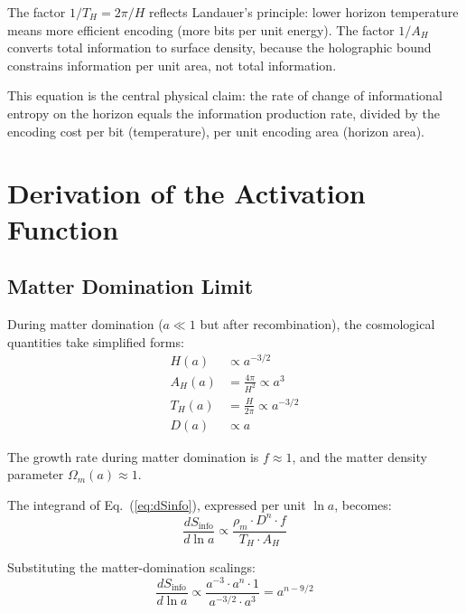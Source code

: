 \documentclass[twocolumn,superscriptaddress,prl,amsmath,amssymb]{revtex4-2}
\begin{document}
The factor $1/T_H = 2\pi/H$ reflects Landauer's principle: lower horizon temperature means more efficient encoding (more bits per unit energy). The factor $1/A_H$ converts total information to surface density, because the holographic bound constrains information per unit area, not total information.

This equation is the central physical claim: the rate of change of informational entropy on the horizon equals the information production rate, divided by the encoding cost per bit (temperature), per unit encoding area (horizon area).

\section{Derivation of the Activation Function}
\label{sec:derivation}

\subsection{Matter Domination Limit}

During matter domination ($a \ll 1$ but after recombination), the cosmological quantities take simplified forms:
\begin{align}
H(a) &\propto a^{-3/2} \label{eq:H_matter}\\
A_H(a) &= \frac{4\pi}{H^2} \propto a^3 \label{eq:AH_matter}\\
T_H(a) &= \frac{H}{2\pi} \propto a^{-3/2} \label{eq:TH_matter}\\
D(a) &\propto a \label{eq:D_matter}
\end{align}

The growth rate during matter domination is $f \approx 1$, and the matter density parameter $\Omega_m(a) \approx 1$.

The integrand of Eq.~(\ref{eq:dSinfo}), expressed per unit $\ln a$, becomes:
\begin{equation}
\frac{dS_\text{info}}{d\ln a} \propto \frac{\rho_m \cdot D^n \cdot f}{T_H \cdot A_H}
\end{equation}

Substituting the matter-domination scalings:
\begin{equation}
\frac{dS_\text{info}}{d\ln a} \propto \frac{a^{-3} \cdot a^n \cdot 1}{a^{-3/2} \cdot a^3} = a^{n - 9/2}
\label{eq:scaling}
\end{equation}
\end{document}
